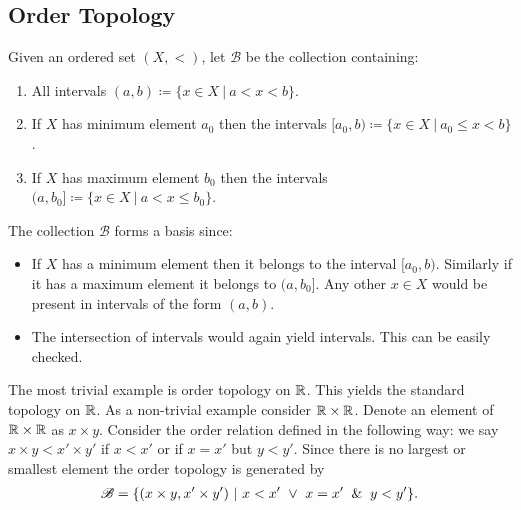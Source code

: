 \subsection{Order Topology}
\begin{definition}
  Given an ordered set $(X,<)$, let $ \mathscr{B}$ be the collection containing:
  \begin{enumerate}
    \item All intervals $(a,b) \coloneqq \{x\in X\ |\ a<x<b\}$.
    \item If $X$ has minimum element $a_0$ then the intervals $[a_0, b) \coloneqq \{x\in X\ |\ a_0\leq x<b\}$. 
    \item If $X$ has maximum element $b_0$ then the intervals $(a, b_0] \coloneqq \{x\in X\ |\ a< x\leq b_0\}$. 
  \end{enumerate}
\end{definition}
\begin{observation}
  The collection $ \mathscr{B}$ forms a basis since:
  \begin{itemize}
    \item If $X$ has a minimum element then it belongs to the interval $[a_0, b)$. Similarly if it has a maximum element it belongs to $(a,b_0]$. Any other $x\in X$ would be present in intervals of the form $(a,b)$.
    \item The intersection of intervals would again yield intervals. This can be easily checked.
  \end{itemize}
\end{observation}
\begin{example}
  The most trivial example is order topology on $\mathbb{R}$. This yields the standard topology on $\mathbb{R}$. As a non-trivial example consider $\mathbb{R}\times \mathbb{R}$. Denote an element of $\mathbb{R}\times \mathbb{R}$ as $x\times y$. Consider the order relation defined in the following way: we say $x\times y < x'\times y'$ if $x<x'$ or if $x=x'$ but $y<y'$. Since there is no largest or smallest element the order topology is generated by
  \begin{align*}
    \mathscr{B} = \{(x\times y, x'\times y')\ |\ x<x'\ \lor\ x=x' \And y<y'\}.
  \end{align*}
\end{example}

